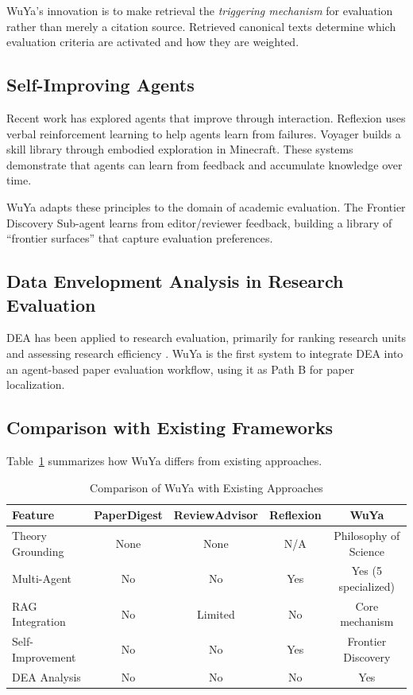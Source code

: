 \documentclass[11pt,a4paper]{article}
\newcommand{\dea}{DEA}
\begin{document}
WuYa's innovation is to make retrieval the \textit{triggering mechanism} for evaluation rather than merely a citation source. Retrieved canonical texts determine which evaluation criteria are activated and how they are weighted.

\subsection{Self-Improving Agents}

Recent work has explored agents that improve through interaction. Reflexion \citep{shinn2023reflexion} uses verbal reinforcement learning to help agents learn from failures. Voyager \citep{wang2023voyager} builds a skill library through embodied exploration in Minecraft. These systems demonstrate that agents can learn from feedback and accumulate knowledge over time.

WuYa adapts these principles to the domain of academic evaluation. The Frontier Discovery Sub-agent learns from editor/reviewer feedback, building a library of ``frontier surfaces'' that capture evaluation preferences.

\subsection{Data Envelopment Analysis in Research Evaluation}

\dea{} has been applied to research evaluation, primarily for ranking research units \citep{johnes2006data} and assessing research efficiency \citep{cherchye2004scientific}. WuYa is the first system to integrate \dea{} into an agent-based paper evaluation workflow, using it as Path B for paper localization.

\subsection{Comparison with Existing Frameworks}

Table~\ref{tab:comparison} summarizes how WuYa differs from existing approaches.

\begin{table}[t]
\centering
\caption{Comparison of WuYa with Existing Approaches}
\label{tab:comparison}
\begin{tabular}{@{}lcccc@{}}
\toprule
\textbf{Feature} & \textbf{PaperDigest} & \textbf{ReviewAdvisor} & \textbf{Reflexion} & \textbf{WuYa} \\
\midrule
Theory Grounding & None & None & N/A & Philosophy of Science \\
Multi-Agent & No & No & Yes & Yes (5 specialized) \\
RAG Integration & No & Limited & No & Core mechanism \\
Self-Improvement & No & No & Yes & Frontier Discovery \\
DEA Analysis & No & No & No & Yes \\
\bottomrule
\end{tabular}
\end{table}
\end{document}
